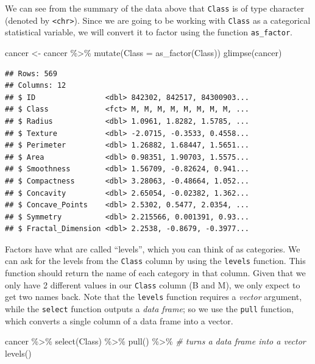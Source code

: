 \documentclass[
]{krantz}
\makeatletter
\newenvironment{Shaded}{\begin{snugshade}}{\end{snugshade}}
\newcommand{\AttributeTok}[1]{\textcolor[rgb]{0.61,0.61,0.61}{#1}}
\newcommand{\CommentTok}[1]{\textcolor[rgb]{0.37,0.37,0.37}{\textit{#1}}}
\newcommand{\FunctionTok}[1]{\textcolor[rgb]{0,0,0}{#1}}
\newcommand{\NormalTok}[1]{#1}
\newcommand{\OtherTok}[1]{\textcolor[rgb]{0.37,0.37,0.37}{#1}}
\newcommand{\SpecialCharTok}[1]{\textcolor[rgb]{0,0,0}{#1}}
\newenvironment{kframe}{%
\medskip{}
\setlength{\fboxsep}{.8em}
 \def\at@end@of@kframe{}%
 \ifinner\ifhmode%
  \def\at@end@of@kframe{\end{minipage}}%
  \begin{minipage}{\columnwidth}%
 \fi\fi%
 \def\FrameCommand##1{\hskip\@totalleftmargin \hskip-\fboxsep
 \colorbox{shadecolor}{##1}\hskip-\fboxsep
     \hskip-\linewidth \hskip-\@totalleftmargin \hskip\columnwidth}%
 \MakeFramed {\advance\hsize-\width
   \@totalleftmargin\z@ \linewidth\hsize
   \@setminipage}}%
 {\par\unskip\endMakeFramed%
 \at@end@of@kframe}
\renewenvironment{Shaded}{\begin{kframe}}{\end{kframe}}
\makeatother
\begin{document}
We can see from the summary of the data above that \texttt{Class} is of type character
(denoted by \texttt{\textless{}chr\textgreater{}}). Since we are going to be working with \texttt{Class} as a
categorical statistical variable, we will convert it to factor using the
function \texttt{as\_factor}.

\begin{Shaded}
\begin{Highlighting}[]
\NormalTok{cancer }\OtherTok{\textless{}{-}}\NormalTok{ cancer }\SpecialCharTok{\%\textgreater{}\%}
  \FunctionTok{mutate}\NormalTok{(}\AttributeTok{Class =} \FunctionTok{as\_factor}\NormalTok{(Class))}
\FunctionTok{glimpse}\NormalTok{(cancer)}
\end{Highlighting}
\end{Shaded}

\begin{verbatim}
## Rows: 569
## Columns: 12
## $ ID                <dbl> 842302, 842517, 84300903...
## $ Class             <fct> M, M, M, M, M, M, M, M, ...
## $ Radius            <dbl> 1.0961, 1.8282, 1.5785, ...
## $ Texture           <dbl> -2.0715, -0.3533, 0.4558...
## $ Perimeter         <dbl> 1.26882, 1.68447, 1.5651...
## $ Area              <dbl> 0.98351, 1.90703, 1.5575...
## $ Smoothness        <dbl> 1.56709, -0.82624, 0.941...
## $ Compactness       <dbl> 3.28063, -0.48664, 1.052...
## $ Concavity         <dbl> 2.65054, -0.02382, 1.362...
## $ Concave_Points    <dbl> 2.5302, 0.5477, 2.0354, ...
## $ Symmetry          <dbl> 2.215566, 0.001391, 0.93...
## $ Fractal_Dimension <dbl> 2.2538, -0.8679, -0.3977...
\end{verbatim}

Factors have what are called ``levels'', which you can think of as categories. We
can ask for the levels from the \texttt{Class} column by using the \texttt{levels} function.
This function should return the name of each category in that column. Given
that we only have 2 different values in our \texttt{Class} column (B and M), we
only expect to get two names back. Note that the \texttt{levels} function requires
a \emph{vector} argument, while the \texttt{select} function outputs a \emph{data frame};
so we use the \texttt{pull} function, which converts a single
column of a data frame into a vector.

\begin{Shaded}
\begin{Highlighting}[]
\NormalTok{cancer }\SpecialCharTok{\%\textgreater{}\%}
  \FunctionTok{select}\NormalTok{(Class) }\SpecialCharTok{\%\textgreater{}\%}
  \FunctionTok{pull}\NormalTok{() }\SpecialCharTok{\%\textgreater{}\%} \CommentTok{\# turns a data frame into a vector}
  \FunctionTok{levels}\NormalTok{()}
\end{Highlighting}
\end{Shaded}
\end{document}
